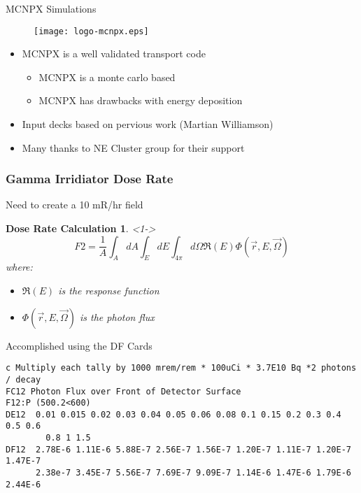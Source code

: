 \begin{frame}{MCNPX Simulations}
	\centering
	\begin{figure}
		\texttt{[image: logo-mcnpx.eps]}
	\end{figure}
\begin{itemize}
    \item MCNPX is a well validated transport code \cite{pelowitz_mcnpx_2010}
    \begin{itemize}
        \item MCNPX is a monte carlo based
        \item MCNPX has drawbacks with energy deposition
    \end{itemize}
    \item Input decks based on pervious work (Martian Williamson)
    \item Many thanks to NE Cluster group for their support
\end{itemize}
\hyperlink{MCNPXMain}{}
\hyperlink{toc}{}
\end{frame}
\begin{frame}[fragile]
\frametitle{Gamma Irridiator Dose Rate}
	\tiny
	Need to create a 10 mR/hr field
	\newtheorem{MCNPXModelTHM10}{Dose Rate Calculation}
	\begin{MCNPXModelTHM10}<1->
		$$F2 = \frac{1}{A} \int_{A}{dA}\int_{E}{dE}\int_{4\pi}{d \Omega \Re(E) \Phi(\vec{r},E,\vec{\Omega})} $$
	where:
	\begin{itemize}
		\item $\Re(E)$ is the response function
		\item $\Phi(\vec{r},E,\vec{\Omega})$ is the photon flux
	\end{itemize}
	\end{MCNPXModelTHM10}
Accomplished using the DF Cards
\begin{lstlisting}
c Multiply each tally by 1000 mrem/rem * 100uCi * 3.7E10 Bq *2 photons / decay
FC12 Photon Flux over Front of Detector Surface
F12:P (500.2<600)
DE12  0.01 0.015 0.02 0.03 0.04 0.05 0.06 0.08 0.1 0.15 0.2 0.3 0.4 0.5 0.6  
		0.8 1 1.5
DF12  2.78E-6 1.11E-6 5.88E-7 2.56E-7 1.56E-7 1.20E-7 1.11E-7 1.20E-7 1.47E-7
      2.38e-7 3.45E-7 5.56E-7 7.69E-7 9.09E-7 1.14E-6 1.47E-6 1.79E-6 2.44E-6
\end{lstlisting}
\hyperlink{MCNPXMain}{}
\hyperlink{toc}{}
\end{frame}


